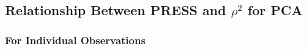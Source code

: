 
\subsection{Relationship Between PRESS and $\rho^2$ for PCA}





\subsubsection{For Individual Observations}

